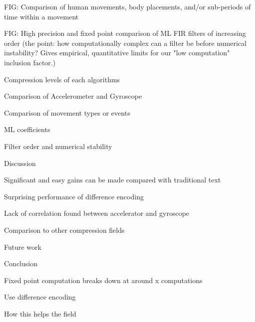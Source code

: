 \documentclass{article}
\begin{document}
\begin{outline}
FIG: Comparison of human movements, body placements, and/or sub-periods of time within a movement

FIG: High precision and fixed point comparison of ML FIR filters of increasing order (the point: how computationally complex can a filter be before numerical instability? Gives empirical, quantitative limits for our "low computation" inclusion factor.)

\begin{outline}
	\item{Compression levels of each algorithms}
	\item{Comparison of Accelerometer and Gyroscope}
	\item{Comparison of movement types or events}
	\item{ML coefficients}
	\item{Filter order and numerical stability}
\end{outline}
\item {Discussion}
\begin{outline}
	\item{Significant and easy gains can be made compared with traditional text}
	\item{Surprising performance of difference encoding}
	\item{Lack of correlation found between accelerator and gyroscope}
	\item{Comparison to other compression fields}
	\item{Future work}
\end{outline}
\item {Conclusion}

\begin{outline}
	\item {Fixed point computation breaks down at around x computations}
	\item {Use difference encoding}
	\item {How this helps the field}
\end{outline}
\end{outline}
\end{document}
